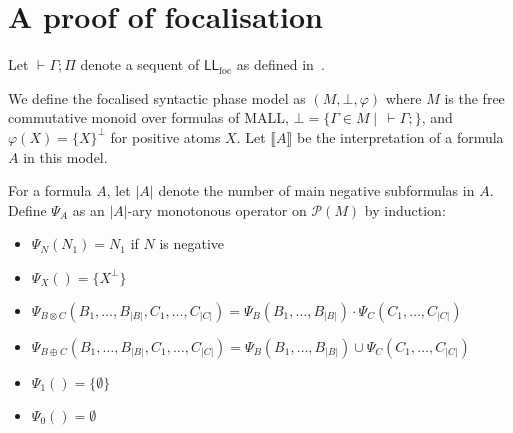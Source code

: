 \documentclass{article}
\author{Naïm Favier}
\newcommand\LL{\textsf{LL}}
\newcommand\LLfoc{{\LL_\text{foc}}}
\newcommand\size[1]{{\lvert #1 \rvert}}
\newcommand\sem[1]{{\llbracket #1 \rrbracket}}
\begin{document}
\section{A proof of focalisation}

Let $\vdash \Gamma; \Pi$ denote a sequent of $\LLfoc$ as defined in~\cite{laurent}.

We define the focalised syntactic phase model as $(M, \bot, \varphi)$ where $M$ is the free commutative monoid over formulas of MALL, $\bot = \{\Gamma \in M \mid\,\vdash \Gamma;\}$, and $\varphi(X) = \{X\}^\perp$ for positive atoms $X$. Let $\sem{A}$ be the interpretation of a formula $A$ in this model.

For a formula $A$, let $\size{A}$ denote the number of main negative subformulas in $A$. Define $\Psi_A$ as an $\size{A}$-ary monotonous operator on $\mathcal P(M)$ by induction:
\begin{itemize}
    \item $\Psi_N(N_1) = N_1$ if $N$ is negative
    \item $\Psi_X() = \{X^\perp\}$
    \item $\Psi_{B \otimes C}(B_1, \dots, B_\size{B}, C_1, \dots, C_\size{C}) = \Psi_B(B_1, \dots, B_\size{B}) \cdot \Psi_C(C_1, \dots, C_\size{C})$
    \item $\Psi_{B \oplus C}(B_1, \dots, B_\size{B}, C_1, \dots, C_\size{C}) = \Psi_B(B_1, \dots, B_\size{B}) \cup \Psi_C(C_1, \dots, C_\size{C})$
    \item $\Psi_1() = \{\emptyset\}$
    \item $\Psi_0() = \emptyset$
\end{itemize}
\end{document}
